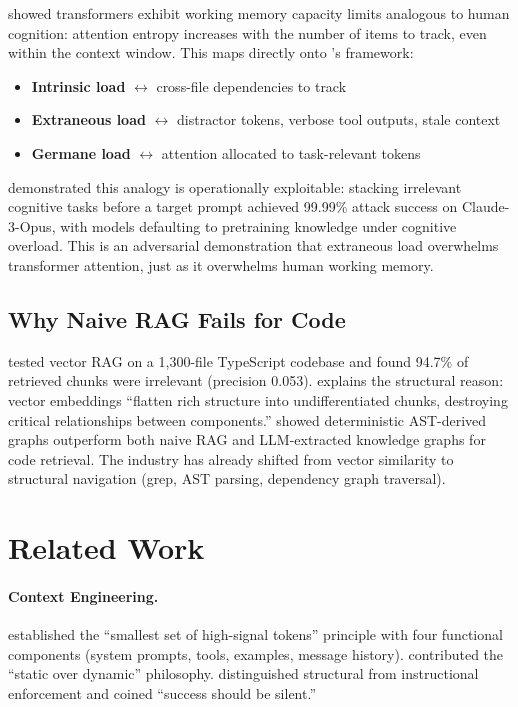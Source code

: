 \documentclass[11pt, a4paper, copyright]{googledeepmind}
\begin{document}
\citet{kim2024working} showed transformers exhibit working memory capacity limits analogous to human cognition: attention entropy increases with the number of items to track, even within the context window. This maps directly onto \citet{sweller1988cognitive}'s framework:

\begin{itemize}[nosep]
    \item \textbf{Intrinsic load} $\leftrightarrow$ cross-file dependencies to track
    \item \textbf{Extraneous load} $\leftrightarrow$ distractor tokens, verbose tool outputs, stale context
    \item \textbf{Germane load} $\leftrightarrow$ attention allocated to task-relevant tokens
\end{itemize}

\citet{guo2024cognitive} demonstrated this analogy is operationally exploitable: stacking irrelevant cognitive tasks before a target prompt achieved 99.99\% attack success on Claude-3-Opus, with models defaulting to pretraining knowledge under cognitive overload. This is an adversarial demonstration that extraneous load overwhelms transformer attention, just as it overwhelms human working memory.

\subsection{Why Naive RAG Fails for Code}

\citet{byterover2025vectorrag} tested vector RAG on a 1,300-file TypeScript codebase and found 94.7\% of retrieved chunks were irrelevant (precision 0.053). \citet{factory2025context} explains the structural reason: vector embeddings ``flatten rich structure into undifferentiated chunks, destroying critical relationships between components.'' \citet{polpichai2026graphrag} showed deterministic AST-derived graphs outperform both naive RAG and LLM-extracted knowledge graphs for code retrieval. The industry has already shifted from vector similarity to structural navigation (grep, AST parsing, dependency graph traversal).


\section{Related Work}
\label{sec:related}

\paragraph{Context Engineering.} \citet{anthropic2025context} established the ``smallest set of high-signal tokens'' principle with four functional components (system prompts, tools, examples, message history). \citet{spotify2025honk} contributed the ``static over dynamic'' philosophy. \citet{humanlayer2025skillissue} distinguished structural from instructional enforcement and coined ``success should be silent.''
\end{document}
